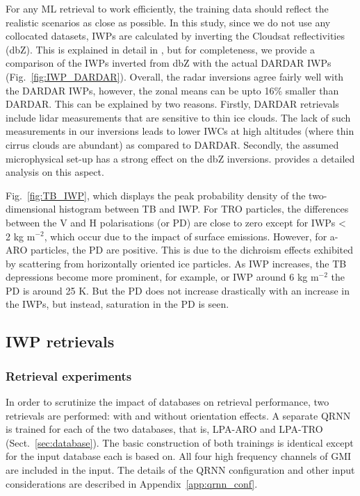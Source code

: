 \documentclass[amt, manuscript]{copernicus}
\begin{document}
For any ML retrieval to work efficiently, the training data should reflect the realistic scenarios as close as possible. In this study, since we do not use any collocated datasets, IWPs are calculated by inverting the Cloudsat reflectivities (dbZ). This is explained in detail in \citet{ekelund2020using}, but for completeness, we provide a comparison of the IWPs inverted from dbZ with the actual DARDAR IWPs (Fig.~\ref{fig:IWP_DARDAR}). Overall, the radar inversions agree
fairly well with the DARDAR IWPs, however, the zonal means can be upto 16\% smaller than DARDAR.  This can be explained by two reasons. Firstly, DARDAR retrievals include lidar measurements that are sensitive to thin ice clouds. The lack of such measurements in our inversions leads to lower IWCs at high altitudes (where thin cirrus clouds are abundant) as compared to DARDAR. Secondly, the assumed microphysical set-up has a strong effect on the dbZ inversions.  \citet{ekelund2020using} provides a detailed analysis on this aspect.

Fig.~\ref{fig:TB_IWP}, which displays the peak probability density of the two-dimensional histogram between TB and IWP. For TRO particles, the differences between the V  and H  polarisations (or PD) are close to zero except for IWPs < 2\,\,kg m$^{-2}$, which occur due to the impact of surface emissions. However, for a-ARO particles, the PD are positive. This is due to the dichroism effects exhibited by scattering from horizontally oriented ice particles. As IWP increases, the TB depressions become more prominent, for example, or IWP around 6\,\,kg m$^{-2}$ the PD is around 25\,\,K. But the PD does not increase drastically with an increase in the IWPs, but instead, saturation in the PD is seen. 

\subsection{IWP retrievals}
%
\label{sec:iwp_retrievals}

\subsubsection{Retrieval experiments}
%
\label{sec:ret_expts}
In order to scrutinize the impact of databases on retrieval performance, two retrievals are performed: with and without orientation effects. A separate QRNN is trained for each of the two databases, that is, LPA-ARO and LPA-TRO (Sect.~\ref{sec:database}). The basic construction of both trainings is identical except for the input database each is based on. All four high frequency channels of GMI are included in the input. The details of the QRNN configuration and other input considerations are described in  Appendix~\ref{app:qrnn_conf}.  
\end{document}
